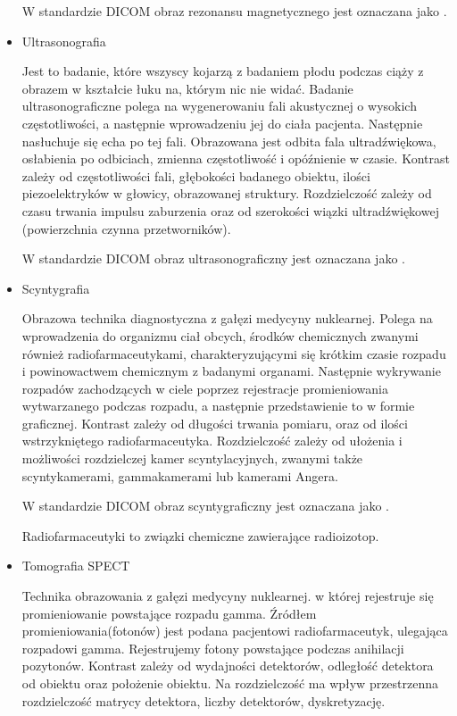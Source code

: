 \begin{itemize}
    W standardzie DICOM obraz rezonansu magnetycznego jest oznaczana jako .
    
    \item Ultrasonografia
    
    Jest to badanie, które wszyscy kojarzą z badaniem płodu podczas ciąży z obrazem w kształcie łuku na, którym nic nie widać.
    Badanie ultrasonograficzne polega na wygenerowaniu fali akustycznej o wysokich częstotliwości, a następnie wprowadzeniu jej do ciała pacjenta.
    Następnie nasłuchuje się echa po tej fali.
    Obrazowana jest odbita fala ultradźwiękowa, osłabienia po odbiciach, zmienna częstotliwość i opóźnienie w czasie.
    Kontrast zależy od częstotliwości fali, głębokości badanego obiektu, ilości piezoelektryków w głowicy, obrazowanej struktury.
    Rozdzielczość zależy od czasu trwania impulsu zaburzenia oraz od szerokości wiązki ultradźwiękowej (powierzchnia czynna przetworników).

    W standardzie DICOM obraz ultrasonograficzny jest oznaczana jako .

    \item Scyntygrafia
    
    Obrazowa technika diagnostyczna z gałęzi medycyny nuklearnej.
    Polega na wprowadzenia do organizmu ciał obcych, środków chemicznych zwanymi również radiofarmaceutykami, charakteryzującymi się krótkim czasie rozpadu i powinowactwem chemicznym z badanymi organami.
    Następnie wykrywanie rozpadów zachodzących w ciele poprzez rejestracje promieniowania wytwarzanego podczas rozpadu, a następnie przedstawienie to w formie graficznej.
    Kontrast zależy od długości trwania pomiaru, oraz od ilości wstrzykniętego radiofarmaceutyka.
    Rozdzielczość zależy od ułożenia i możliwości rozdzielczej kamer scyntylacyjnych, zwanymi także scyntykamerami, gammakamerami lub kamerami Angera.

    W standardzie DICOM obraz scyntygraficzny jest oznaczana jako .

    Radiofarmaceutyki to związki chemiczne zawierające radioizotop.

    \item Tomografia SPECT
    
    Technika obrazowania  z gałęzi medycyny nuklearnej. w której rejestruje się promieniowanie powstające rozpadu gamma.
    Źródłem promieniowania(fotonów) jest podana pacjentowi radiofarmaceutyk, ulegająca rozpadowi gamma.
    Rejestrujemy fotony powstające podczas anihilacji pozytonów.
    Kontrast zależy od wydajności detektorów, odległość detektora od obiektu oraz położenie obiektu.
    Na rozdzielczość ma wpływ przestrzenna rozdzielczość matrycy detektora, liczby detektorów, dyskretyzację.


\end{itemize}
